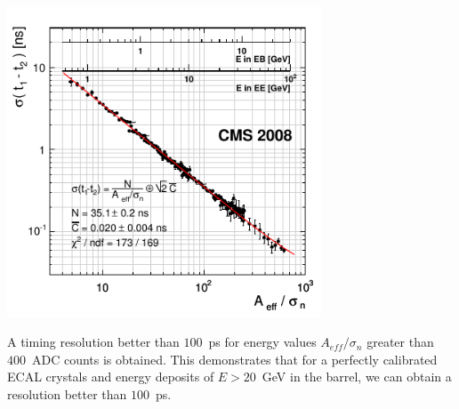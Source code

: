 \begin{center}
\centering
\mbox{\includegraphics[height=0.6\textwidth, width=0.7\textwidth]{THESISPLOTS/ECAL_Timing_Resolution.png}}
\label{fig:FitTimeRes}
\end{center}
A timing resolution better than $100$~ps for energy values $A_{eff}/\sigma_{n}$ greater than $400$~ADC counts is obtained. This demonstrates that for a perfectly calibrated ECAL crystals and energy deposits of $E > 20$~GeV in the barrel, we can obtain a resolution better than $100$~ps. 

